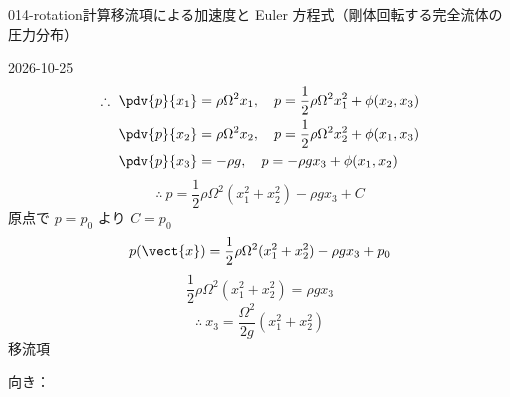 \documentclass[uplatex,dvipdfmx,a4paper,11pt]{jsarticle}
\begin{document}
\begin{mondai}{014-rotation}{計算}{移流項による加速度と Euler 方程式（剛体回転する完全流体の圧力分布）}
\begin{kotaeutsushi}{2026-10-25}
\begin{align*}
\therefore\ \pdv{p}{x_{1}}&=\rho\Omega^{2}x_{1},\quad p=\frac{1}{2}\rho\Omega^{2}x_{1}^{2}+\phi(x_{2},x_{3})\\
\pdv{p}{x_{2}}&=\rho\Omega^{2}x_{2},\quad p=\frac{1}{2}\rho\Omega^{2}x_{2}^{2}+\phi(x_{1},x_{3})\\
\pdv{p}{x_{3}}&=-\rho g,\quad p=-\rho gx_{3}+\phi(x_{1},x_{2})
\end{align*}
\[ \therefore\ p=\frac{1}{2}\rho\Omega^{2}(x_{1}^{2}+x_{2}^{2})-\rho gx_{3}+C \]
原点で $p=p_{0}$ より $C=p_{0}$
\[ p(\vect{x})=\frac{1}{2}\rho\Omega^{2}(x_{1}^{2}+x_{2}^{2})-\rho gx_{3}+p_{0} \]
\[ \frac{1}{2}\rho\Omega^{2}(x_{1}^{2}+x_{2}^{2})=\rho gx_{3} \]
\[ \therefore\ x_{3}=\frac{\Omega^{2}}{2g}(x_{1}^{2}+x_{2}^{2}) \]
移流項

向き：


\end{kotaeutsushi}
\end{mondai}
\end{document}
